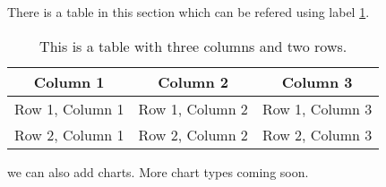 There is a table in this section which can be refered using label \ref{tab:mytable}.

\begin{table}[h]
    \centering
    \begin{tabular}{|c|c|c|}
        \hline
        Column 1        & Column 2        & Column 3        \\
        \hline
        Row 1, Column 1 & Row 1, Column 2 & Row 1, Column 3 \\
        Row 2, Column 1 & Row 2, Column 2 & Row 2, Column 3 \\
        \hline
    \end{tabular}
    \caption{This is a table with three columns and two rows.}
    \label{tab:mytable}
\end{table}

we can also add charts. More chart types coming soon.


